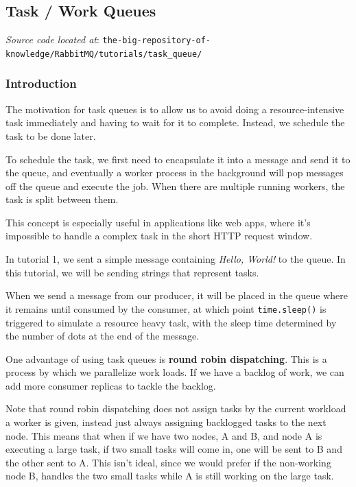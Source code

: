 \documentclass{article}
\begin{document}
\subsection{Task / Work Queues}

\textit{Source code located at}: \verb|the-big-repository-of-knowledge/RabbitMQ/tutorials/task_queue/|

\subsubsection{Introduction}

The motivation for task queues is to allow us to avoid doing a resource-intensive task immediately and having to wait for it to complete. Instead, we schedule the task to be done later.

To schedule the task, we first need to encapsulate it into a message and send it to the queue, and eventually a worker process in the background will pop messages off the queue and execute the job. When there are multiple running workers, the task is split between them.

This concept is especially useful in applications like web apps, where it's impossible to handle a complex task in the short HTTP request window.

In tutorial 1, we sent a simple message containing \textit{Hello, World!} to the queue. In this tutorial, we will be sending strings that represent tasks. 

When we send a message from our producer, it will be placed in the queue where it remains until consumed by the consumer, at which point \verb|time.sleep()| is triggered to simulate a resource heavy task, with the sleep time determined by the number of dots at the end of the message.

One advantage of using task queues is \textbf{round robin dispatching}. This is a process by which we parallelize work loads. If we have a backlog of work, we can add more consumer replicas to tackle the backlog.

Note that round robin dispatching does not assign tasks by the current workload a worker is given, instead just always assigning backlogged tasks to the next node. This means that when if we have two nodes, A and B, and node A is executing a large task, if two small tasks will come in, one will be sent to B and the other sent to A. This isn't ideal, since we would prefer if the non-working node B, handles the two small tasks while A is still working on the large task.
\end{document}
